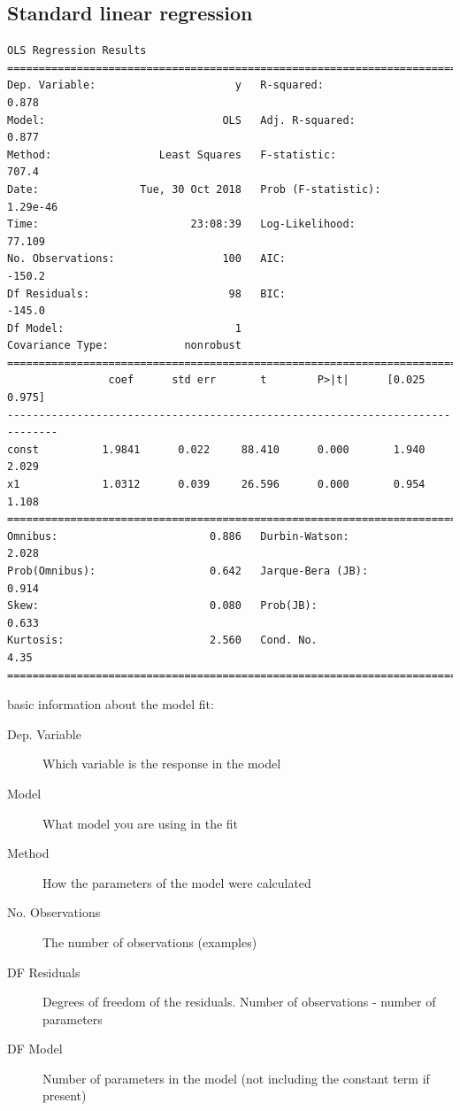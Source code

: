 \begin{refsection}
\subsection{Standard linear regression}



\begin{verbatim}
OLS Regression Results                            
==============================================================================
Dep. Variable:                      y   R-squared:                       0.878
Model:                            OLS   Adj. R-squared:                  0.877
Method:                 Least Squares   F-statistic:                     707.4
Date:                Tue, 30 Oct 2018   Prob (F-statistic):           1.29e-46
Time:                        23:08:39   Log-Likelihood:                 77.109
No. Observations:                 100   AIC:                            -150.2
Df Residuals:                      98   BIC:                            -145.0
Df Model:                           1                                         
Covariance Type:            nonrobust                                         
==============================================================================
                coef      std err       t        P>|t|      [0.025      0.975]
------------------------------------------------------------------------------
const          1.9841      0.022     88.410      0.000       1.940       2.029
x1             1.0312      0.039     26.596      0.000       0.954       1.108
==============================================================================
Omnibus:                        0.886   Durbin-Watson:                   2.028
Prob(Omnibus):                  0.642   Jarque-Bera (JB):                0.914
Skew:                           0.080   Prob(JB):                        0.633
Kurtosis:                       2.560   Cond. No.                         4.35
==============================================================================
\end{verbatim}

basic information about the model fit:
\begin{description}
	\item[Dep. Variable] Which variable is the response in the model
	\item[Model]	What model you are using in the fit
	\item[Method]	How the parameters of the model were calculated
	\item[No. Observations]	The number of observations (examples)
	\item[DF Residuals]	Degrees of freedom of the residuals. Number of observations - number of parameters
	\item[DF Model]	Number of parameters in the model (not including the constant term if present)
\end{description}	


\end{refsection}
